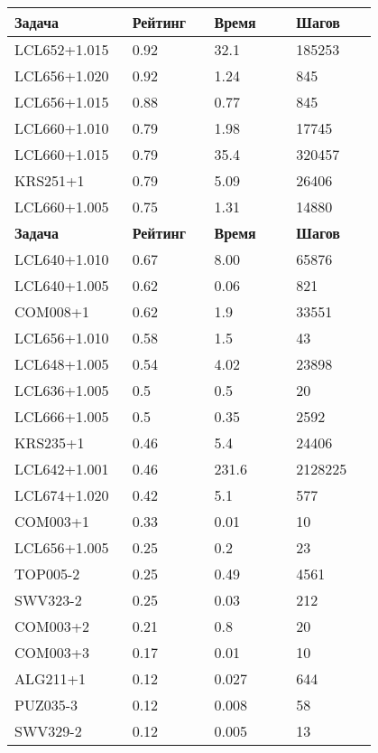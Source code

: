 \begin{longtable}[H]{|p{0.2\linewidth}|p{0.2\linewidth}|p{0.2\linewidth}|p{0.2\linewidth}|}
\hline
\textbf{Задача} & \textbf{Рейтинг} & \textbf{Время} & \textbf{Шагов} \\
\hline
LCL652+1.015 & 0.92 & 32.1 & 185253 \\
\hline
LCL656+1.020 & 0.92 & 1.24 & 845 \\
\hline
LCL656+1.015 & 0.88 & 0.77 & 845 \\
\hline
LCL660+1.010 & 0.79 & 1.98 & 17745 \\
\hline
LCL660+1.015 & 0.79 & 35.4 & 320457 \\
\hline
KRS251+1 & 0.79 & 5.09 & 26406 \\
\hline
LCL660+1.005 & 0.75 & 1.31 & 14880 \\
\hline
\textbf{Задача} & \textbf{Рейтинг} & \textbf{Время} & \textbf{Шагов} \\
\hline
LCL640+1.010 & 0.67 & 8.00 & 65876 \\
\hline
LCL640+1.005 &  0.62 &  0.06 &  821 \\
\hline
COM008+1 & 0.62 & 1.9 & 33551 \\
\hline
LCL656+1.010 &  0.58 &  1.5 &  43 \\
\hline
LCL648+1.005 &  0.54 &  4.02 &  23898 \\
\hline
LCL636+1.005 &  0.5 &  0.5 &  20 \\
\hline
LCL666+1.005 &  0.5 &  0.35 &  2592 \\
\hline
KRS235+1 & 0.46 & 5.4 & 24406 \\
\hline
LCL642+1.001 & 0.46 & 231.6 & 2128225 \\
\hline
LCL674+1.020 &  0.42 &  5.1 &  577 \\
\hline
COM003+1 &  0.33 &  0.01 &  10 \\
\hline
LCL656+1.005 &  0.25 &  0.2 &  23 \\
\hline
TOP005-2 & 0.25 & 0.49 & 4561 \\
\hline
SWV323-2 & 0.25 & 0.03 & 212 \\
\hline
COM003+2 &  0.21 &  0.8 &  20 \\
\hline
COM003+3 &  0.17 &  0.01 &  10 \\
\hline
ALG211+1 &  0.12 &  0.027 &  644 \\
\hline
PUZ035-3 & 0.12 & 0.008 & 58 \\
\hline
SWV329-2 & 0.12 & 0.005 & 13 \\

\end{longtable}
